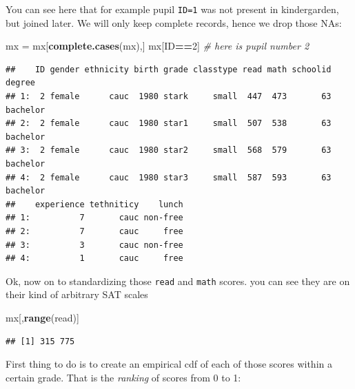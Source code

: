 \documentclass[]{book}
\newenvironment{Shaded}{\begin{snugshade}}{\end{snugshade}}
\newcommand{\KeywordTok}[1]{\textcolor[rgb]{0.13,0.29,0.53}{\textbf{#1}}}
\newcommand{\DecValTok}[1]{\textcolor[rgb]{0.00,0.00,0.81}{#1}}
\newcommand{\StringTok}[1]{\textcolor[rgb]{0.31,0.60,0.02}{#1}}
\newcommand{\CommentTok}[1]{\textcolor[rgb]{0.56,0.35,0.01}{\textit{#1}}}
\newcommand{\OperatorTok}[1]{\textcolor[rgb]{0.81,0.36,0.00}{\textbf{#1}}}
\newcommand{\NormalTok}[1]{#1}
\begin{document}
You can see here that for example pupil \texttt{ID=1} was not present in
kindergarden, but joined later. We will only keep complete records,
hence we drop those NAs:

\begin{Shaded}
\begin{Highlighting}[]
\NormalTok{mx =}\StringTok{ }\NormalTok{mx[}\KeywordTok{complete.cases}\NormalTok{(mx),]}
\NormalTok{mx[ID}\OperatorTok{==}\DecValTok{2}\NormalTok{]  }\CommentTok{# here is pupil number 2}
\end{Highlighting}
\end{Shaded}

\begin{verbatim}
##    ID gender ethnicity birth grade classtype read math schoolid   degree
## 1:  2 female      cauc  1980 stark     small  447  473       63 bachelor
## 2:  2 female      cauc  1980 star1     small  507  538       63 bachelor
## 3:  2 female      cauc  1980 star2     small  568  579       63 bachelor
## 4:  2 female      cauc  1980 star3     small  587  593       63 bachelor
##    experience tethniticy    lunch
## 1:          7       cauc non-free
## 2:          7       cauc     free
## 3:          3       cauc non-free
## 4:          1       cauc     free
\end{verbatim}

Ok, now on to standardizing those \texttt{read} and \texttt{math}
scores. you can see they are on their kind of arbitrary SAT scales

\begin{Shaded}
\begin{Highlighting}[]
\NormalTok{mx[,}\KeywordTok{range}\NormalTok{(read)]}
\end{Highlighting}
\end{Shaded}

\begin{verbatim}
## [1] 315 775
\end{verbatim}

First thing to do is to create an empirical cdf of each of those scores
within a certain grade. That is the \emph{ranking} of scores from 0 to
1:
\end{document}
